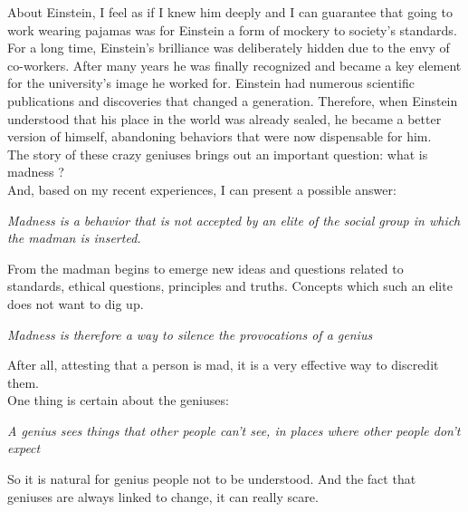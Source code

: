 \documentclass[11pt]{book}
\begin{document}
\noindent About Einstein, I feel as if I knew him deeply and I can guarantee that going to work wearing pajamas was for Einstein a form of mockery to society's standards. \\

\noindent For a long time, Einstein's brilliance was deliberately hidden due to the envy of co-workers. After many years he was finally recognized and became a key element for the university's image he worked for. Einstein had numerous scientific publications and discoveries that changed a generation. Therefore, when Einstein understood that his place in the world was already sealed, he became a better version of himself, abandoning behaviors that were now dispensable for him. \\

\noindent The story of these crazy geniuses brings out an important question: what is madness ? \\

\noindent And, based on my recent experiences, I can present a possible answer:

\noindent \begin{center} \emph{Madness is a behavior that is not accepted by an elite of the social group in which the madman is inserted.} \end{center}

\noindent From the madman begins to emerge new ideas and questions related to standards, ethical questions, principles and truths. Concepts which such an elite does not want to dig up.

\noindent \begin{center} \emph{Madness is therefore a way to silence the provocations of a genius} \end{center}

After all, attesting that a person is mad, it is a very effective way to discredit them.  \\

\noindent One thing is certain about the geniuses:

\noindent \begin{center} \emph{A genius sees things that other people can't see, in places where other people don't expect} \end{center}

\noindent So it is natural for genius people not to be understood. And the fact that geniuses are always linked to change, it can really scare. \\
\end{document}
